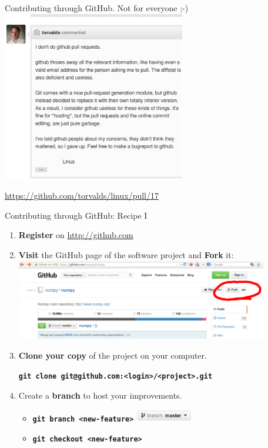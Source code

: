 \documentclass{beamer}
\begin{document}
\begin{frame}{Contributing through GitHub. Not for everyone ;-)}
\includegraphics[width=8cm]{figs/linus-on-pull-requests}
\begin{center}
  \url{https://github.com/torvalds/linux/pull/17}
\end{center}
\end{frame}

\begin{frame}{Contributing through GitHub: Recipe I}
  \begin{enumerate}
  \item \textbf{Register} on \url{http://github.com}
  \item \textbf{Visit} the GitHub page of the software project and
    \textbf{Fork} it:
    \hbox{\hspace{-1cm}\includegraphics[width=11cm]{figs/github-fork}}
  \item \textbf{Clone your copy} of the project on your computer.
    \begin{center}
      \begin{footnotesize}
        \texttt{\textbf{git clone git@github.com:<login>/<project>.git}}
      \end{footnotesize}
    \end{center}
  \item Create a \textbf{branch} to host your improvements.
    \begin{itemize}
    \item \texttt{\textbf{git branch <new-feature>}} \includegraphics[height=0.55cm]{figs/github-branch}
    \item \texttt{\textbf{git checkout <new-feature>}}
    \end{itemize}
  \end{enumerate}
\end{frame}
\end{document}
